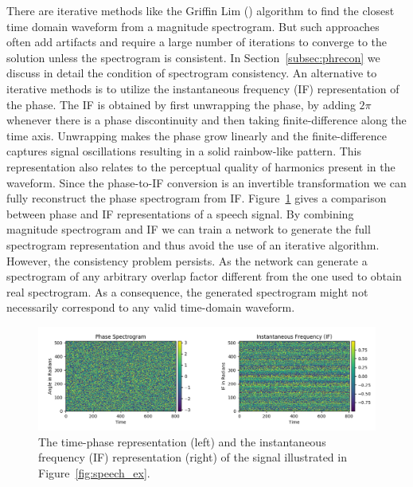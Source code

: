 There are iterative methods like the Griffin Lim (\cite{griffin1984signal}) algorithm to find the closest time domain waveform from a magnitude spectrogram. But such approaches often add artifacts and require a large number of iterations to converge to the solution unless the spectrogram is consistent. In Section~\ref{subsec:phrecon} we discuss in detail the condition of spectrogram consistency. An alternative to iterative methods is to utilize the instantaneous frequency (IF) representation of the phase. The IF is obtained by first unwrapping the phase, by adding $2\pi$ whenever there is a phase discontinuity and then taking finite-difference along the time axis. Unwrapping makes the phase grow linearly and the finite-difference captures signal oscillations resulting in a solid rainbow-like pattern. This representation also relates to the perceptual quality of harmonics present in the waveform. Since the phase-to-IF conversion is an invertible transformation we can fully reconstruct the phase spectrogram from IF. Figure~\ref{fig:phase_response} gives a comparison between phase and IF representations of a speech signal. By combining magnitude spectrogram and IF we can train a network to generate the full spectrogram representation and thus avoid the use of an iterative algorithm.
However, the consistency problem persists. As the network can generate a spectrogram of any arbitrary overlap factor different from the one used to obtain real spectrogram.  As a consequence, the generated spectrogram might not necessarily correspond to any valid time-domain waveform. 

\begin{figure}
    \centering
    \includegraphics[width=0.85\columnwidth, height=0.40\columnwidth]{master_thesis_template/figs/phase_res.png}
    \caption[Phase and IF representation of a speech signal]{The time-phase representation (left) and the instantaneous frequency (IF) representation (right) of the signal illustrated in Figure~\ref{fig:speech_ex}.}
    \label{fig:phase_response}
\end{figure}

